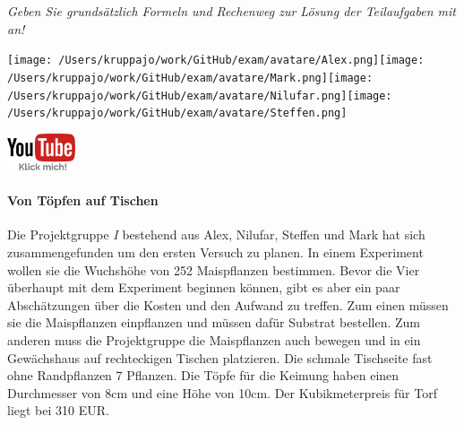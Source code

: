 \documentclass[a4paper, 9pt]{scrartcl}\usepackage[]{graphicx}\usepackage[]{xcolor}
\begin{document}
\textit{Geben Sie grundsätzlich Formeln und Rechenweg zur Lösung der Teilaufgaben mit an!} \\[1Ex]
 

 
\ifcollection
\begin{flushright}
\tiny\vspace{-3Ex}
\textbf{\examinhaltstart}
\exammodulemathstat
\vspace{-4Ex}
\end{flushright}
\begin{minipage}[t]{0.5\textwidth}
\texttt{[image: /Users/kruppajo/work/GitHub/exam/avatare/Alex.png]}\hspace{-4mm}\texttt{[image: /Users/kruppajo/work/GitHub/exam/avatare/Mark.png]}\hspace{-4mm}\texttt{[image: /Users/kruppajo/work/GitHub/exam/avatare/Nilufar.png]}\hspace{-4mm}\texttt{[image: /Users/kruppajo/work/GitHub/exam/avatare/Steffen.png]}
\end{minipage}
\begin{minipage}[t]{0.5\textwidth}
\hfill
\href{https://youtu.be/57B-yYoFSk0}{\includegraphics[width = 2cm]{img/youtube}}
\end{minipage}
\fi



\ifcollection
\paragraph{Von Töpfen auf Tischen}
\fi



Die Projektgruppe \textit{I} bestehend aus Alex, Nilufar, Steffen und Mark hat sich zusammengefunden um den ersten Versuch zu planen. In einem Experiment wollen sie die Wuchshöhe von 252 Maispflanzen bestimmen. Bevor die Vier überhaupt mit dem Experiment beginnen können, gibt es aber ein paar Abschätzungen über die Kosten und den Aufwand zu treffen. Zum einen müssen sie die Maispflanzen einpflanzen und müssen dafür Substrat bestellen. Zum anderen muss die Projektgruppe die Maispflanzen auch bewegen und in ein Gewächshaus auf rechteckigen Tischen platzieren. Die schmale Tischseite fast ohne Randpflanzen 7 Pflanzen. Die Töpfe für die Keimung haben
einen Durchmesser von 8cm und eine Höhe von 10cm. Der Kubikmeterpreis für Torf liegt bei 310 EUR. 
\end{document}
